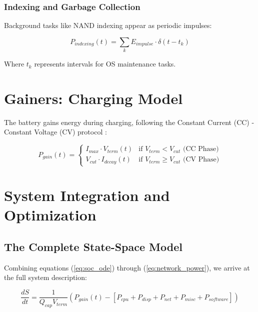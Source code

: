 \documentclass[12pt]{article}
\begin{document}
\subsubsection{Indexing and Garbage Collection}

Background tasks like NAND indexing appear as periodic impulses:

\begin{equation}
P_{indexing}(t) = \sum_{k} E_{impulse} \cdot \delta(t - t_k)
\end{equation}

Where $t_k$ represents intervals for OS maintenance tasks.

\section{Gainers: Charging Model}

The battery gains energy during charging, following the Constant Current (CC) - Constant Voltage (CV) protocol \cite{6}:

\begin{equation} \label{eq:charging}
P_{gain}(t) = \begin{cases} 
I_{max} \cdot V_{term}(t) & \text{if } V_{term} < V_{cut} \text{ (CC Phase)} \\
V_{cut} \cdot I_{decay}(t) & \text{if } V_{term} \ge V_{cut} \text{ (CV Phase)}
\end{cases}
\end{equation}

\newpage


\section{System Integration and Optimization}

\subsection{The Complete State-Space Model}

Combining equations (\ref{eq:soc_ode}) through (\ref{eq:network_power}), we arrive at the full system description:

\begin{equation}
\frac{dS}{dt} = \frac{1}{Q_{cap} V_{term}} \left( P_{gain}(t) - \left[ P_{cpu} + P_{disp} + P_{net} + P_{misc} + P_{software} \right] \right)
\end{equation}
\end{document}
